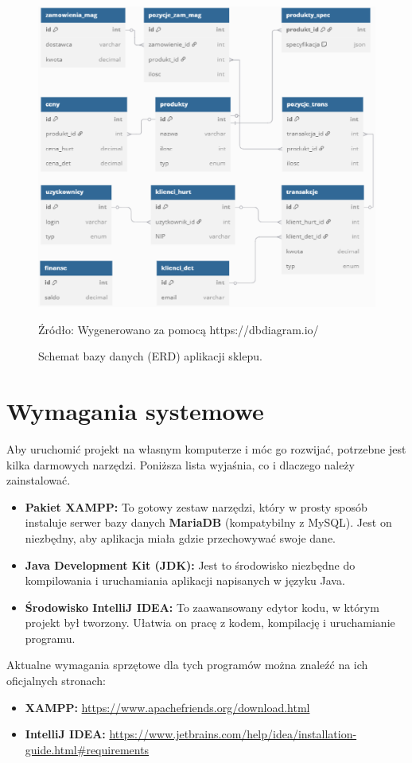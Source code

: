\begin{figure}[H]
    \centering
    \includegraphics[width=\linewidth]{figures/fig_0001.eps}
    \caption{Schemat bazy danych (ERD) aplikacji sklepu.}
    \label{fig:erd_diagram}
    \small{Źródło: Wygenerowano za pomocą https://dbdiagram.io/}
\end{figure}
\clearpage

\section{Wymagania systemowe}
Aby uruchomić projekt na własnym komputerze i móc go rozwijać, potrzebne jest kilka darmowych narzędzi. Poniższa lista wyjaśnia, co i dlaczego należy zainstalować.
\begin{itemize}
    \item \textbf{Pakiet XAMPP:} To gotowy zestaw narzędzi, który w prosty sposób instaluje serwer bazy danych \textbf{MariaDB} (kompatybilny z MySQL). Jest on niezbędny, aby aplikacja miała gdzie przechowywać swoje dane.
    \item \textbf{Java Development Kit (JDK):} Jest to środowisko niezbędne do kompilowania i uruchamiania aplikacji napisanych w języku Java.
    \item \textbf{Środowisko IntelliJ IDEA:} To zaawansowany edytor kodu, w którym projekt był tworzony. Ułatwia on pracę z kodem, kompilację i uruchamianie programu.
\end{itemize}
Aktualne wymagania sprzętowe dla tych programów można znaleźć na ich oficjalnych stronach:
\begin{itemize}
    \item \textbf{XAMPP:} \url{https://www.apachefriends.org/download.html}
    \item \textbf{IntelliJ IDEA:} \url{https://www.jetbrains.com/help/idea/installation-guide.html#requirements}
\end{itemize}